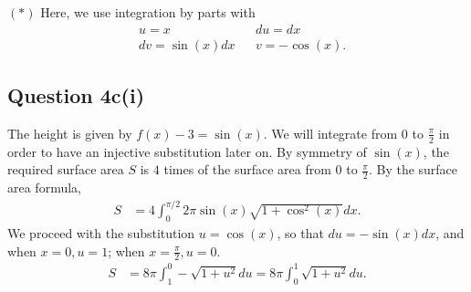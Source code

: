 \documentclass[12pt]{article}
\begin{document}
$(*)$ Here, we use integration by parts with
\begin{align*}
    & u=x            && du=dx \\
    & dv=\sin(x)dx   && v=-\cos(x).
\end{align*}

\newpage
\subsection*{Question 4c(i)}
The height is given by $f(x)-3=\sin(x)$. We will integrate from $0$ to $\frac{\pi}{2}$ in order to have an injective substitution later on. By symmetry of $\sin(x)$, the required surface area $S$ is $4$ times of the surface area from $0$ to $\frac{\pi}{2}$. By the surface area formula,\begin{align*}
    S &= 4\int_0^{\pi/2}2\pi\sin(x)\sqrt{1+\cos^2(x)}dx.
\end{align*}
We proceed with the substitution $u=\cos(x)$, so that $du=-\sin(x)dx$, and when $x=0, u=1$; when $x=\frac{\pi}{2}, u=0$.
\begin{align*}
    S &= 8\pi\int_1^0-\sqrt{1+u^2}du = 8\pi\int_0^1\sqrt{1+u^2}du. 
\end{align*}
\end{document}
